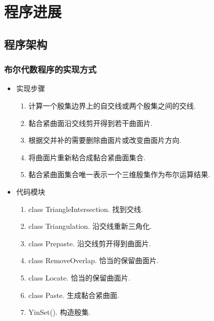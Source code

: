 \documentclass[UTF8]{ctexbeamer}	%
\theoremstyle{plain}
\theoremstyle{definition}
\theoremstyle{remark}
\numberwithin{equation}{section}
\begin{document}
\section{程序进展}
\subsection{程序架构}
\begin{frame}
    \frametitle{布尔代数程序的实现方式}
    \begin{itemize}
        \item 实现步骤
    \begin{enumerate}
        \item 计算一个殷集边界上的自交线或两个殷集之间的交线.
        \item 黏合紧曲面沿交线剪开得到若干曲面片.
        \item 根据交并补的需要删除曲面片或改变曲面片方向.
        \item 将曲面片重新粘合成黏合紧曲面集合.
        \item 黏合紧曲面集合唯一表示一个三维殷集作为布尔运算结果.
    \end{enumerate}

        \item 代码模块
        \begin{enumerate}
            \item class TriangleIntersection. 找到交线.
            \item class Triangulation. 沿交线重新三角化.
            \item class Prepaste. 沿交线剪开得到曲面片.
            \item class RemoveOverlap. 恰当的保留曲面片.
            \item class Locate. 恰当的保留曲面片.
            \item class Paste. 生成黏合紧曲面.
            \item YinSet(). 构造殷集.
        \end{enumerate}
    \end{itemize}
\end{frame}
\end{document}

